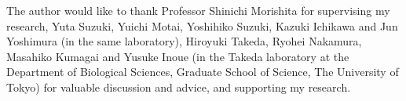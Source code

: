 The author would like to thank Professor Shinichi Morishita for supervising my research, Yuta Suzuki, Yuichi Motai, Yoshihiko Suzuki, Kazuki Ichikawa and Jun Yoshimura (in the same laboratory), Hiroyuki Takeda, Ryohei Nakamura, Masahiko Kumagai and Yusuke Inoue (in the Takeda laboratory at the Department of Biological Sciences, Graduate School of Science, The University of Tokyo) for valuable discussion and advice, and supporting my research.
